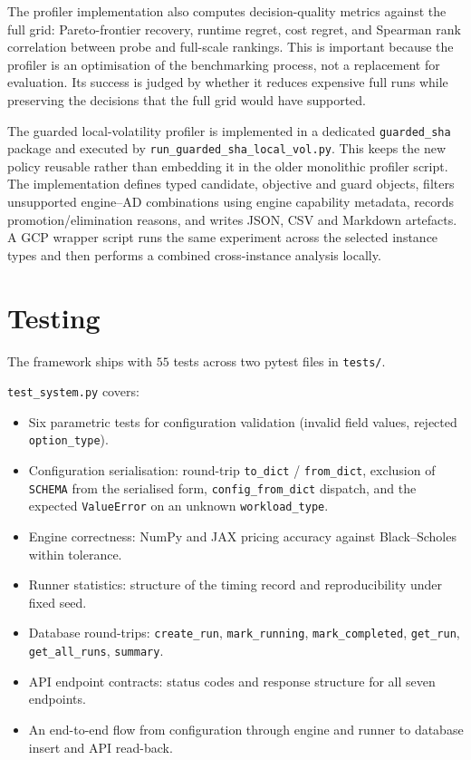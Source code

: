 The profiler implementation also computes decision-quality metrics against the
full grid: Pareto-frontier recovery, runtime regret, cost regret, and Spearman
rank correlation between probe and full-scale rankings. This is important
because the profiler is an optimisation of the benchmarking process, not a
replacement for evaluation. Its success is judged by whether it reduces
expensive full runs while preserving the decisions that the full grid would
have supported.

The guarded local-volatility profiler is implemented in a dedicated
\texttt{guarded\_sha} package and executed by
\texttt{run\_guarded\_sha\_local\_vol.py}. This keeps the new policy reusable
rather than embedding it in the older monolithic profiler script. The
implementation defines typed candidate, objective and guard objects, filters
unsupported engine--AD combinations using engine capability metadata, records
promotion/elimination reasons, and writes JSON, CSV and Markdown artefacts. A
GCP wrapper script runs the same experiment across the selected instance types
and then performs a combined cross-instance analysis locally.

\section{Testing}
\label{sec:impl-testing}

The framework ships with $55$ tests across two pytest files in \texttt{tests/}.

\texttt{test\_system.py} covers:

\begin{itemize}
    \item Six parametric tests for configuration validation (invalid field
          values, rejected \texttt{option\_type}).
    \item Configuration serialisation: round-trip \texttt{to\_dict} /
          \texttt{from\_dict}, exclusion of \texttt{SCHEMA} from the serialised
          form, \texttt{config\_from\_dict} dispatch, and the expected
          \texttt{ValueError} on an unknown \texttt{workload\_type}.
    \item Engine correctness: NumPy and JAX pricing accuracy against
          Black--Scholes within tolerance.
    \item Runner statistics: structure of the timing record and
          reproducibility under fixed seed.
    \item Database round-trips: \texttt{create\_run},
          \texttt{mark\_running}, \texttt{mark\_completed}, \texttt{get\_run},
          \texttt{get\_all\_runs}, \texttt{summary}.
    \item API endpoint contracts: status codes and response structure for all
          seven endpoints.
    \item An end-to-end flow from configuration through engine and runner to
          database insert and API read-back.
\end{itemize}

